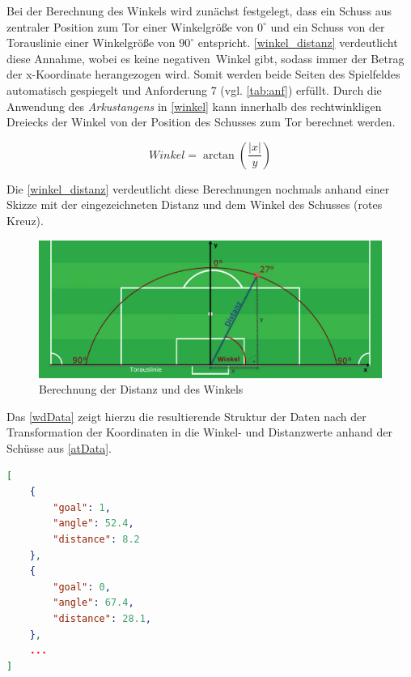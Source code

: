 Bei der Berechnung des Winkels wird zunächst festgelegt, dass ein Schuss aus zentraler Position zum Tor einer Winkelgröße von $0^\circ$ und ein Schuss von der Torauslinie einer Winkelgröße von $90^\circ$ entspricht. \vref{winkel_distanz} verdeutlicht diese Annahme, wobei es keine \glqq negativen\grqq~Winkel gibt, sodass immer der Betrag der x-Koordinate herangezogen wird. Somit werden beide Seiten des Spielfeldes automatisch gespiegelt und Anforderung 7 (vgl. \vref{tab:anf}) erfüllt. Durch die Anwendung des \textit{Arkustangens} in \vref{winkel} kann innerhalb des rechtwinkligen Dreiecks der Winkel von der Position des Schusses zum Tor berechnet werden.

\begin{equation}
\label{winkel}
Winkel= \arctan(\frac{|x|}{y})
\end{equation}

Die \vref{winkel_distanz} verdeutlicht diese Berechnungen nochmals anhand einer Skizze mit der eingezeichneten Distanz und dem Winkel des Schusses	 (rotes Kreuz).

\begin{figure}[H]
\centering
\includegraphics[scale=0.45]{se-wa-jpg/winkel_distanz}
\caption[Berechnung der Distanz und des Winkels]{Berechnung der Distanz und des Winkels}
\label{winkel_distanz}
\end{figure}

Das \vref{wdData} zeigt hierzu die resultierende Struktur der Daten nach der Transformation der Koordinaten in die Winkel- und Distanzwerte anhand der Schüsse aus \vref{atData}.\newline

\begin{lstlisting}[caption=\captionListingText,language=json,xleftmargin=5mm,label=wdData] 
[
	{
		"goal": 1,
		"angle": 52.4,
		"distance": 8.2
	},
	{
		"goal": 0,
		"angle": 67.4,
		"distance": 28.1,
	},
	...
]
\end{lstlisting}

